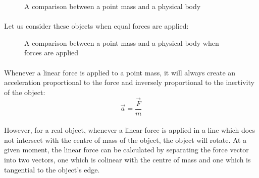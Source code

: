 \documentclass[a4paper]{article}
\begin{document}
\begin{figure}[ht]
  \centering
  \caption{A comparison between a point mass and a physical body}
  \label{fig:pm-rb-comparison}
\end{figure}

\paragraph*{}
Let us consider these objects when equal forces are applied:

\begin{figure}[ht]
  \centering
  \caption{A comparison between a point mass and a physical body when forces
  are applied}
\end{figure}

\paragraph*{}
Whenever a linear force is applied to a point mass, it will always create an
acceleration proportional to the force and inversely proportional to the
inertivity of the object:
$$
\vec{a} = \frac{\vec{F}}{m}
$$

\paragraph*{}
However, for a real object, whenever a linear force is applied in a line which
does not intersect with the centre of mass of the object, the object will
rotate. At a given moment, the linear force can be calculated by separating the
force vector into two vectors, one which is colinear with the centre of mass
and one which is tangential to the object's edge.

%
%
\end{document}
